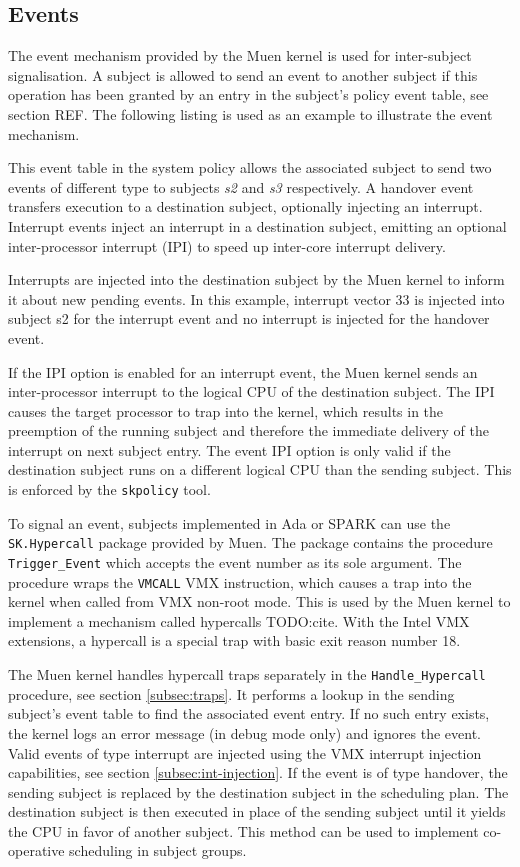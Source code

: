 \subsection{Events}\label{subsec:events}
The event mechanism provided by the Muen kernel is used for
inter-subject signalisation. A subject is allowed to send an event to another
subject if this operation has been granted by an entry in the subject's policy
event table, see section REF. The following listing is used as an example to
illustrate the event mechanism.



This event table in the system policy allows the associated subject to send two
events of different type to subjects \emph{s2} and \emph{s3} respectively. A
handover event transfers execution to a destination subject, optionally
injecting an interrupt.  Interrupt events inject an interrupt in a destination
subject, emitting an optional inter-processor interrupt (IPI) to
speed up inter-core interrupt delivery.

Interrupts are injected into the destination subject by the Muen kernel to
inform it about new pending events. In this example, interrupt vector 33 is
injected into subject s2 for the interrupt event and no interrupt is injected
for the handover event.

If the IPI option is enabled for an interrupt event, the Muen kernel sends an
inter-processor interrupt to the logical CPU of the destination subject. The
IPI causes the target processor to trap into the kernel, which results in the
preemption of the running subject and therefore the immediate delivery of the
interrupt on next subject entry. The event IPI option is only valid if the
destination subject runs on a different logical CPU than the sending subject.
This is enforced by the \texttt{skpolicy} tool.

To signal an event, subjects implemented in Ada or SPARK can use the
\texttt{SK.Hypercall} package provided by Muen. The package contains the
procedure \texttt{Trigger\_Event} which accepts the event number as its sole
argument. The procedure wraps the \texttt{VMCALL} VMX instruction, which causes
a trap into the kernel when called from VMX non-root mode. This is used by the
Muen kernel to implement a mechanism called hypercalls TODO:cite.
With the Intel VMX extensions, a hypercall is a special trap with basic exit
reason number 18.

The Muen kernel handles hypercall traps separately in the
\texttt{Handle\_Hypercall} procedure, see section \ref{subsec:traps}. It
performs a lookup in the sending subject's event table to find the associated
event entry. If no such entry exists, the kernel logs an error message (in
debug mode only) and ignores the event. Valid events of type interrupt are
injected using the VMX interrupt injection capabilities, see section
\ref{subsec:int-injection}. If the event is of type handover, the sending
subject is replaced by the destination subject in the scheduling plan. The
destination subject is then executed in place of the sending subject until it
yields the CPU in favor of another subject. This method can be used to implement
co-operative scheduling in subject groups.


